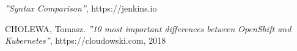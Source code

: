 \documentclass[a4paper, 12pt]{report}
\numberwithin{equation}{section}
\begin{document}
\begin{thebibliography}{9}
            \emph{''Syntax Comparison''},
            https://jenkins.io
            
            
            
        CHOLEWA, Tomasz.
            \emph{''10 most important differences between OpenShift and Kubernetes''},
            https://cloudowski.com, 2018
        
            
            
\end{thebibliography}
\end{document}
